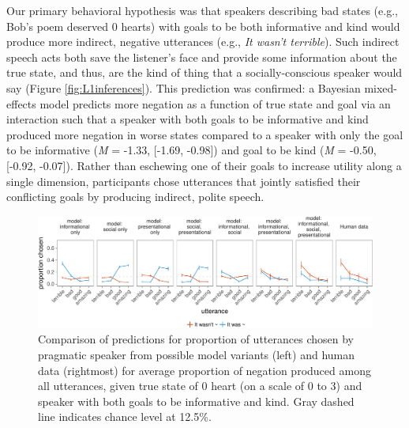 \documentclass[9pt,twocolumn,twoside,lineno]{main_class_file}
\begin{document}
Our primary behavioral hypothesis was that speakers describing bad
states (e.g., Bob's poem deserved 0 hearts) with goals to be both
informative and kind would produce more indirect, negative utterances
(e.g., \emph{It wasn't terrible}). Such indirect speech acts both
save the listener's face and provide some information about the
true state, and thus, are the kind of thing that a socially-conscious speaker would say (Figure \ref{fig:L1inferences}).
This prediction was confirmed: a Bayesian mixed-effects
model predicts more negation as a function of true state and goal via
an interaction such that a speaker with both goals to be informative and
kind produced more negation in worse states compared to a speaker with
only the goal to be informative (\emph{M} = -1.33, {[}-1.69, -0.98{]})
and goal to be kind (\emph{M} = -0.50, {[}-0.92, -0.07{]}). Rather than
eschewing one of their goals to increase utility along a single
dimension, participants chose utterances that jointly satisfied their
conflicting goals by producing indirect, polite speech.

\begin{figure}[!h]
\includegraphics[width=\textwidth]{fig/comparison-1} \caption{Comparison of predictions for proportion of utterances chosen by pragmatic speaker from possible model variants (left) and human data (rightmost) for average proportion of negation produced among all utterances, given true state of 0 heart (on a scale of 0 to 3) and speaker with both goals to be informative and kind. Gray dashed line indicates chance level at 12.5\%.}\label{fig:comparison}
\end{figure}
\end{document}
